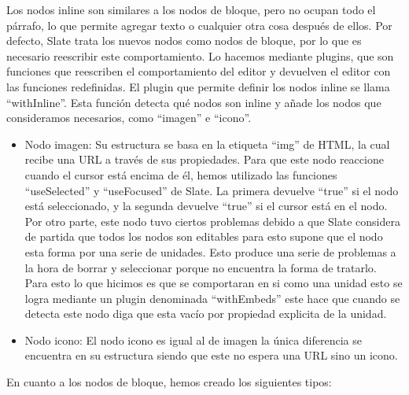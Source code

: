 Los nodos inline son similares a los nodos de bloque, pero no ocupan todo el párrafo, lo que permite agregar texto o cualquier otra cosa después de ellos. Por defecto, Slate trata los nuevos nodos como nodos de bloque, por lo que es necesario reescribir este comportamiento. Lo hacemos mediante plugins, que son funciones que reescriben el comportamiento del editor y devuelven el editor con las funciones redefinidas. El plugin que permite definir los nodos inline se llama ``withInline''. Esta función detecta qué nodos son inline y añade los nodos que consideramos necesarios, como ``imagen'' e ``icono''.
\begin{itemize}
  \item Nodo imagen: Su estructura se basa en la etiqueta ``img'' de HTML, la cual recibe una URL a través de sus propiedades. Para que este nodo reaccione cuando el cursor está encima de él, hemos utilizado las funciones ``useSelected'' y ``useFocused'' de Slate. La primera devuelve ``true'' si el nodo está seleccionado, y la segunda devuelve ``true'' si el cursor está en el nodo. Por otro parte, este nodo tuvo ciertos problemas debido a que Slate considera de partida que todos los nodos son editables para esto supone que el nodo esta forma por una serie de unidades. Esto produce una serie de problemas a la hora de borrar y seleccionar porque no encuentra la forma de tratarlo. Para esto lo que hicimos es que se comportaran en si como una unidad esto se logra mediante un plugin denominada ``withEmbeds'' este hace que cuando se detecta este nodo diga que esta vacío por
        propiedad explicita de la unidad.
  \item Nodo icono: El nodo icono es igual al de imagen la única diferencia se encuentra en su estructura siendo que este no espera una URL sino un icono.
\end{itemize}

En cuanto a los nodos de bloque, hemos creado los siguientes tipos:

